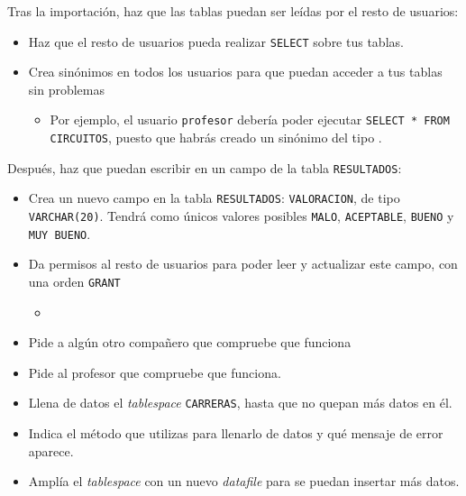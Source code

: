 \begin{homeworkProblem}
  Tras la importación, haz que las tablas puedan ser leídas por el resto de usuarios:
  \begin{itemize}
  \item Haz que el resto de usuarios pueda realizar \texttt{SELECT} sobre tus tablas.  
  \item Crea sinónimos en todos los usuarios para que puedan acceder a tus tablas sin problemas
    \begin{itemize}
    \item Por ejemplo, el usuario \texttt{profesor} debería poder ejecutar \texttt{SELECT * FROM CIRCUITOS}, puesto que habrás creado un sinónimo del tipo .
    \end{itemize}
  \end{itemize}

  Después, haz que puedan escribir en un campo de la tabla \texttt{RESULTADOS}:
  \begin{itemize}
  \item Crea un nuevo campo en la tabla \texttt{RESULTADOS}: \texttt{VALORACION}, de tipo \texttt{VARCHAR(20)}. Tendrá como únicos valores posibles \texttt{MALO}, \texttt{ACEPTABLE}, \texttt{BUENO} y \texttt{MUY BUENO}.
    
  \item Da permisos al resto de usuarios para poder leer y actualizar este campo, con una orden \texttt{GRANT}
    \begin{itemize}
    \item {}
    \end{itemize}

  \item Pide a algún otro compañero que compruebe que funciona
  \item Pide al profesor que compruebe que funciona.

  \end{itemize}
\end{homeworkProblem}

\begin{homeworkProblem}
  \begin{itemize}
  \item Llena de datos el \textit{tablespace} \texttt{CARRERAS}, hasta que no quepan más datos en él.
  \item Indica el método que utilizas para llenarlo de datos y qué mensaje de error aparece.
  \item Amplía el \textit{tablespace}  con un nuevo \textit{datafile} para se puedan insertar más datos.
  \end{itemize}
\end{homeworkProblem}

